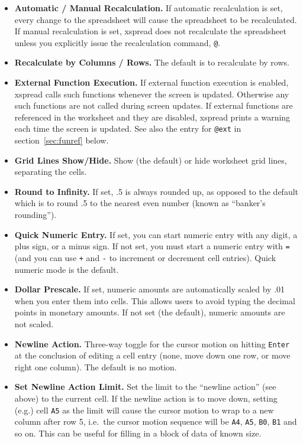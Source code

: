 \documentclass[titlepage]{article}
\newcommand{\titem}[1]{\item[{\tt #1}]}
\begin{document}
\begin{itemize}
\titem{a} {\bf Automatic / Manual Recalculation.}  If automatic
    recalculation is set, every change to the spreadsheet will cause
    the spreadsheet to be recalculated.  If manual recalculation is
    set, \textsf{xspread} does not recalculate the spreadsheet unless
    you explicitly issue the recalculation command, \texttt{@}.

\titem{c} {\bf Recalculate by Columns / Rows.} The default is to
    recalculate by rows.
    
\titem{e} {\bf External Function Execution.}  If external
    function execution is enabled, \textsf{xspread} calls such
    functions whenever the screen is updated.  Otherwise any such
    functions are not called during screen updates.  If external
    functions are referenced in the worksheet and they are disabled,
    \textsf{xspread} prints a warning each time the screen is
    updated.  See also the entry for \texttt{@ext} in
    section~\ref{sec:funref} below.

\titem{g} {\bf Grid Lines Show/Hide.}  Show (the default) or hide
    worksheet grid lines, separating the cells.
    
\titem{i} {\bf Round to Infinity.} If set, .5 is always rounded
    up, as opposed to the default which is to round .5 to the nearest
    even number (known as ``banker's rounding'').
    
\titem{n} {\bf Quick Numeric Entry.} If set, you can start numeric
    entry with any digit, a plus sign, or a minus sign.  If not set,
    you must start a numeric entry with \texttt{=} (and you can use
    \texttt{+} and \texttt{-} to increment or decrement cell entries).
    Quick numeric mode is the default.

\titem{\$} {\bf Dollar Prescale.}  If set, numeric amounts are
    automatically scaled by .01 when you enter them into cells.  This
    allows users to avoid typing the decimal points in monetary
    amounts.  If not set (the default), numeric amounts are not scaled.
    
\titem{r} {\bf Newline Action.} Three-way toggle for the cursor
    motion on hitting \texttt{Enter} at the conclusion of editing a
    cell entry (none, move down one row, or move right one column).
    The default is no motion.
    
\titem{z} {\bf Set Newline Action Limit.}  Set the limit to the
    ``newline action'' (see above) to the current cell.  If the
    newline action is to move down, setting (e.g.) cell \texttt{A5} as
    the limit will cause the cursor motion to wrap to a new column
    after row 5, i.e.\ the cursor motion sequence will be \texttt{A4},
    \texttt{A5}, \texttt{B0}, \texttt{B1} and so on.  This can be
    useful for filling in a block of data of known size.

\end{itemize}
\end{document}
